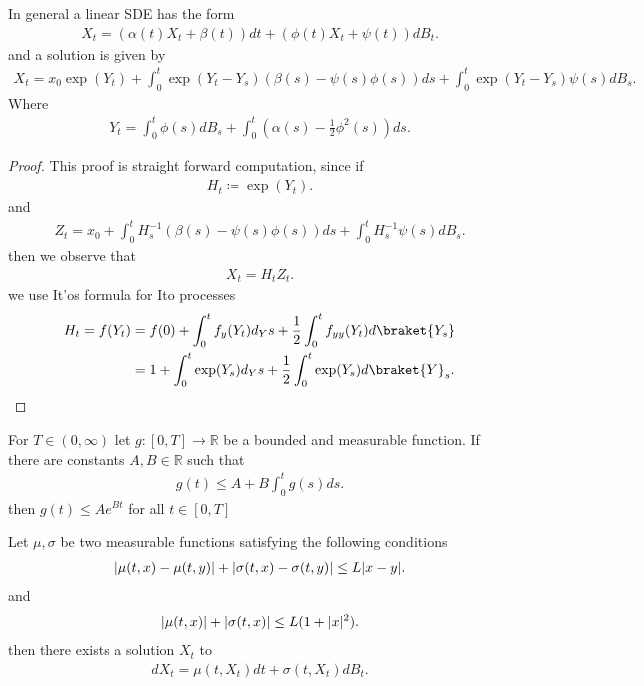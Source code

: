 \begin{Prop}[5.2.]
 In general a linear SDE has the form
 \begin{align*}
  X_t = (\alpha (t)X_t + \beta(t) )dt + (\phi(t)X_t + \psi(t))dB_t
 .\end{align*}
 and a solution is given by 
 \begin{align*}
  X_t  = x_{0}\exp(Y_t) + \int_0^{t} \exp(Y_t-Y_s)(\beta(s)-\psi(s)\phi(s))  ds + \int_0^{t}  \exp(Y_t-Y_s)\psi(s)dB_s
 .\end{align*}
 Where
 \begin{align*}
  Y_t = \int_0^{t} \phi(s) dB_s + \int_0^{t}(\alpha(s)-\frac{1}{2}\phi^2(s))   ds
 .\end{align*}
\end{Prop}
\begin{proof}
 This proof is straight forward computation, since if 
 \begin{align*}
  H_t \coloneqq  \exp(Y_t)
 .\end{align*}
 and 
 \begin{align*}
  Z_t = x_{0} + \int_0^{t} H^{-1}_s(\beta(s)-\psi(s)\phi(s)) ds + \int_0^{t}H_s^{-1}\psi(s)dB_s    
 .\end{align*}
 then we observe that 
 \begin{align*}
  X_t = H_tZ_t
 .\end{align*}
 we use It'os formula for Ito processes 
 \begin{align*}
   H_t = f(Y_t) &= f(0) + \int_0^{t} f_y(Y_t) d_Ys + \frac{1}{2} \int_0^{t} f_{yy}(Y_t) d\braket{Y_s}  \\
                &= 1 + \int_0^{t} \exp(Y_s) d_Ys + \frac{1}{2 } \int_0^{t} \exp(Y_s) d\braket{Y}_s   
 .\end{align*}
\end{proof}
\begin{Lemma}[5.5]
  For $T \in  (0,\infty)$  let $g : [0,T] \to \mathbb{R}$ be a bounded and measurable function.
  If there are constants $A,B \in  \mathbb{R}$ such that  
  \begin{align*}
    g(t) \le  A + B \int_0^{t} g(s) ds 
  .\end{align*}
  then $g(t) \le  A e^{Bt} $ for all $t \in [0,T]$
\end{Lemma}
\begin{Theorem}[5.3.]
 Let $\mu ,\sigma $  be two measurable functions satisfying the following conditions 
 \begin{align*}
  \lvert\mu(t,x) - \mu(t,y)\rvert + \lvert\sigma(t,x)-\sigma(t,y)\rvert \le  L \lvert x-y\rvert
 .\end{align*}
 and 
 \begin{align*}
  \lvert\mu(t,x)\rvert + \lvert\sigma(t,x)\rvert \le L(1+\lvert x\rvert^2)
 .\end{align*}
 then there exists a solution $X_t$  to 
 \begin{align*}
  dX_t = \mu(t,X_t) dt + \sigma(t,X_t) dB_t 
 .\end{align*}
\end{Theorem}
